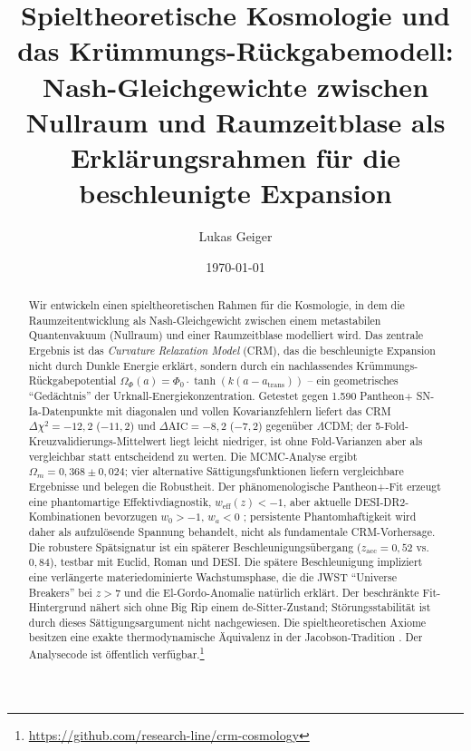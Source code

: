 \documentclass[aps,prd,twocolumn,superscriptaddress,nofootinbib]{revtex4-2}
\begin{document}

\title{Spieltheoretische Kosmologie und das Krümmungs-Rückgabemodell: Nash-Gleichgewichte zwischen Nullraum und Raumzeitblase als Erklärungsrahmen für die beschleunigte Expansion}

\author{Lukas Geiger}

\date{\today}


\begin{abstract}
Wir entwickeln einen spieltheoretischen Rahmen für die Kosmologie, in dem die Raumzeitentwicklung als Nash-Gleichgewicht zwischen einem metastabilen Quantenvakuum (Nullraum) und einer Raumzeitblase modelliert wird. Das zentrale Ergebnis ist das \textit{Curvature Relaxation Model} (CRM), das die beschleunigte Expansion nicht durch Dunkle Energie erklärt, sondern durch ein nachlassendes Krümmungs-Rückgabepotential $\Omega_\Phi(a) = \Phi_0 \cdot \tanh(k(a - a_{\mathrm{trans}}))$ -- ein geometrisches ``Gedächtnis'' der Urknall-Energiekonzentration. Getestet gegen 1.590 Pantheon+ SN-Ia-Datenpunkte \cite{Scolnic2022} mit diagonalen und vollen Kovarianzfehlern liefert das CRM $\Delta\chi^2 = -12{,}2$ ($-11{,}2$) und $\Delta\mathrm{AIC} = -8{,}2$ ($-7{,}2$) gegenüber $\Lambda$CDM; der 5-Fold-Kreuzvalidierungs-Mittelwert liegt leicht niedriger, ist ohne Fold-Varianzen aber als vergleichbar statt entscheidend zu werten. Die MCMC-Analyse ergibt $\Omega_m = 0{,}368 \pm 0{,}024$; vier alternative Sättigungsfunktionen liefern vergleichbare Ergebnisse und belegen die Robustheit. Der phänomenologische Pantheon+-Fit erzeugt eine phantomartige Effektivdiagnostik, $w_{\mathrm{eff}}(z)<-1$, aber aktuelle DESI-DR2-Kombinationen bevorzugen $w_0>-1$, $w_a<0$ \cite{DESI2025}; persistente Phantomhaftigkeit wird daher als aufzulösende Spannung behandelt, nicht als fundamentale CRM-Vorhersage. Die robustere Spätsignatur ist ein späterer Beschleunigungsübergang ($z_{\mathrm{acc}} = 0{,}52$ vs.\ $0{,}84$), testbar mit Euclid, Roman und DESI. Die spätere Beschleunigung impliziert eine verlängerte materiedominierte Wachstumsphase, die die JWST ``Universe Breakers'' bei $z > 7$ \cite{Labbe2023} und die El-Gordo-Anomalie \cite{Asencio2023} natürlich erklärt. Der beschränkte Fit-Hintergrund nähert sich ohne Big Rip einem de-Sitter-Zustand; Störungsstabilität ist durch dieses Sättigungsargument nicht nachgewiesen. Die spieltheoretischen Axiome besitzen eine exakte thermodynamische Äquivalenz in der Jacobson-Tradition \cite{Jacobson1995}. Der Analysecode ist öffentlich verfügbar.\footnote{\url{https://github.com/research-line/crm-cosmology}}

\end{abstract}
\end{document}
